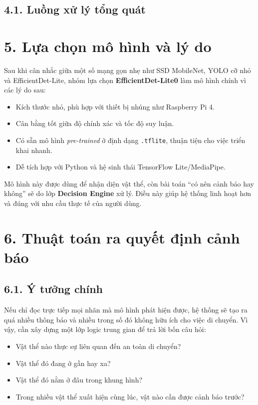 \documentclass[11pt, a4paper]{article}
\begin{document}
\subsection*{4.1. Luồng xử lý tổng quát}
\begin{center}
\end{center}

\section*{5. Lựa chọn mô hình và lý do}
Sau khi cân nhắc giữa một số mạng gọn nhẹ như SSD MobileNet, YOLO cỡ nhỏ và EfficientDet-Lite, nhóm lựa chọn \textbf{EfficientDet-Lite0} làm mô hình chính vì các lý do sau:
\begin{itemize}
    \item Kích thước nhỏ, phù hợp với thiết bị nhúng như Raspberry Pi 4.
    \item Cân bằng tốt giữa độ chính xác và tốc độ suy luận.
    \item Có sẵn mô hình \textit{pre-trained} ở định dạng \texttt{.tflite}, thuận tiện cho việc triển khai nhanh.
    \item Dễ tích hợp với Python và hệ sinh thái TensorFlow Lite/MediaPipe.
\end{itemize}

Mô hình này được dùng để nhận diện vật thể, còn bài toán ``có nên cảnh báo hay không'' sẽ do lớp \textbf{Decision Engine} xử lý. Điều này giúp hệ thống linh hoạt hơn và đúng với nhu cầu thực tế của người dùng.

\section*{6. Thuật toán ra quyết định cảnh báo}
\subsection*{6.1. Ý tưởng chính}
Nếu chỉ đọc trực tiếp mọi nhãn mà mô hình phát hiện được, hệ thống sẽ tạo ra quá nhiều thông báo và nhiều trong số đó không hữu ích cho việc di chuyển. Vì vậy, cần xây dựng một lớp logic trung gian để trả lời bốn câu hỏi:
\begin{itemize}
    \item Vật thể nào thực sự liên quan đến an toàn di chuyển?
    \item Vật thể đó đang ở gần hay xa?
    \item Vật thể đó nằm ở đâu trong khung hình?
    \item Trong nhiều vật thể xuất hiện cùng lúc, vật nào cần được cảnh báo trước?
\end{itemize}
\end{document}
